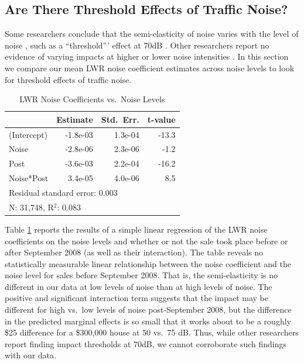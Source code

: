 \documentclass{article}\usepackage[]{graphicx}\usepackage[]{color}
\begin{document}
\subsection{Are There Threshold Effects of Traffic Noise?}

Some researchers conclude that the semi-elasticity of noise varies with the level of noise \citep{Andersson2010, MarmolejoDuarteCarlos;GonzalezTamez2009, Theebe2004a, Miedema2001, Wilhelmsson2000}, such as a ``threshold''' effect at 70dB \citep{Wilhelmsson2000, Cohen2009}. Other researchers report no evidence of varying impacts at higher or lower noise intensities \citep{Blanco2011, Baranzini2010, Kim2007, Huang;Palmquist2001}. In this section we compare our mean LWR noise coefficient estimates across noise levels to look for threshold effects of traffic noise.

\begin{table}
\begin{center}
\caption{LWR Noise Coefficients vs.\ Noise Levels}\label{tab:LWRnonlinear}
\begin{tabular}{lrrr}
         &   Estimate & Std.\ Err. & t-value \\ \hline
(Intercept) & -1.8e-03 & 1.3e-04  &-13.3 \\
Noise       & -2.8e-06 & 2.3e-06  & -1.2 \\  
Post        & -3.6e-03 & 2.2e-04  &-16.2 \\
Noise*Post  &  3.4e-05 & 4.0e-06  &  8.5 \\ \hline
\multicolumn{4}{l}{Residual standard error: 0.003} \\
\multicolumn{4}{l}{N: 31,748, R$^2$: 0.083} \\
\end{tabular}
\end{center}
\end{table}

Table \ref{tab:LWRnonlinear} reports the results of a simple linear regression of the LWR noise coefficients on the noise levels and whether or not the sale took place before or after September 2008 (as well as their interaction). The table reveals no statistically measurable linear relationship between the noise coefficient and the noise level for sales before September 2008. That is, the semi-elasticity is no different in our data at low levels of noise than at high levels of noise. The positive and significant interaction term suggests that the impact may be different for high vs.\ low levels of noise post-September 2008, but the difference in the predicted marginal effects is so small that it works about to be a roughly \$25 difference for a \$300,000 house at 50 vs.\ 75 dB. Thus, while other researchers report finding impact thresholds at 70dB, we cannot corroborate such findings with our data.
\end{document}
